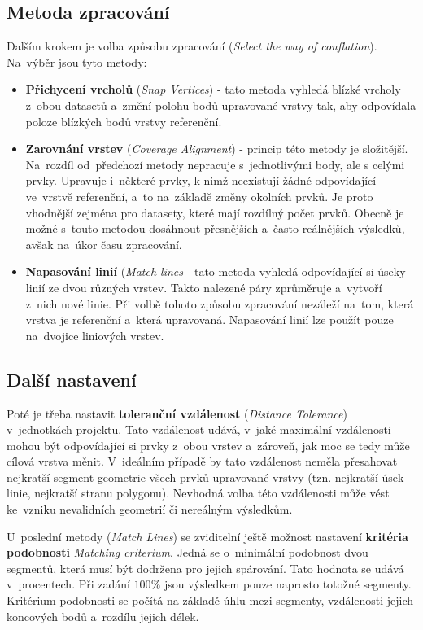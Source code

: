 \subsection{Metoda zpracování}
Dalším krokem je volba způsobu zpracování (\textit{Select the way of conflation}). 
Na~výběr jsou tyto metody:

\begin{itemize}
 \item \textbf{Přichycení vrcholů} (\textit{Snap Vertices}) - tato metoda vyhledá 
	blízké vrcholy z~obou datasetů a~změní polohu bodů upravované vrstvy tak, 
	aby odpovídala poloze blízkých bodů vrstvy referenční.
 \item \textbf{Zarovnání vrstev} (\textit{Coverage Alignment}) - princip této 
	metody je složitější. Na~rozdíl od~předchozí metody nepracuje s~jednotlivými
	body, ale s celými prvky. Upravuje i~některé prvky, k nimž neexistují 
	žádné odpovídající ve~vrstvě refe\-renční, a~to na~základě změny okolních 
	prvků. Je proto vhodnější zejména pro datasety, které mají rozdílný počet
	prvků. Obecně je možné s~touto metodou dosáhnout přesnějších a~často
	reálnějších výsledků, avšak na~úkor času zpraco\-vání.
 \item \textbf{Napasování linií} (\textit{Match lines} - tato metoda vyhledá
	odpovídající si úseky linií ze dvou různých vrstev. Takto nalezené
	páry zprůměruje a~vytvoří z~nich nové linie. Při volbě tohoto způsobu
	zpracování nezáleží na~tom, která vrstva je referenční a~která upravovaná.
	Napasování linií lze použít pouze na~dvojice liniových vrstev.
\end{itemize}

\subsection{Další nastavení}
Poté je třeba nastavit \textbf{toleranční vzdálenost} (\textit{Distance 
Tolerance}) v~jednotkách projektu. Tato vzdálenost udává, v~jaké maximální 
vzdálenosti mohou být odpovídající si prvky z~obou vrstev a~zároveň, jak 
moc se tedy může cílová vrstva měnit. V~ideálním případě by tato vzdálenost 
neměla přesahovat nejkratší segment geometrie všech prvků upravované vrstvy 
(tzn. nejkratší úsek linie, nejkratší stranu polygonu). Nevhodná volba této 
vzdálenosti může vést ke~vzniku nevalidních geometrií či nereálným výsledkům.

U~poslední metody (\textit{Match Lines}) se zviditelní ještě možnost nastavení
\textbf{kritéria podobnosti} \textit{Matching criterium}. Jedná se o~minimální 
podobnost dvou segmentů, která musí být dodržena pro jejich spárování. 
Tato hodnota se udává v~procentech. Při zadání $100 \%$ jsou výsledkem pouze 
naprosto totožné segmenty. Kritérium podobnosti se počítá na základě úhlu mezi 
segmenty, vzdálenosti jejich koncových bodů a~rozdílu jejich délek. 


